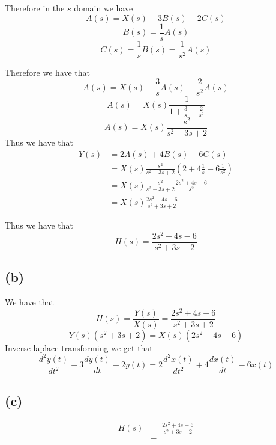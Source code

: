 \documentclass[12pt]{article}
\begin{document}
Therefore in the $s$ domain we have
$$A(s)=X(s)-3B(s)-2C(s)$$
$$B(s)=\frac{1}{s}A(s)$$
$$C(s)=\frac{1}{s}B(s)=\frac{1}{s^2}A(s)$$


Therefore we have that 
$$A(s)=X(s)-\frac{3}{s}A(s)-\frac{2}{s^2}A(s)$$
$$A(s)=X(s)\frac{1}{1+\frac{3}{s}+\frac{2}{s^2}}$$
$$A(s)=X(s)\frac{s^2}{s^2+3s+2}$$
Thus we have that 
\begin{align*}
Y(s)&=2A(s)+4B(s)-6C(s)\\
&=X(s)\frac{s^2}{s^2+3s+2}\left(2+4\frac{1}{s}-6\frac{1}{s^2}\right)\\
&=X(s)\frac{s^2}{s^2+3s+2}\frac{2s^2+4s-6}{s^2}\\
&=X(s)\frac{2s^2+4s-6}{s^2+3s+2}
\end{align*}

Thus we have that
$$H(s)=\boxed{\frac{2s^2+4s-6}{s^2+3s+2}}$$
\subsection*{(b)}
We have that
$$H(s)=\frac{Y(s)}{X(s)}=\frac{2s^2+4s-6}{s^2+3s+2}$$
$$Y(s)(s^2+3s+2)=X(s)(2s^2+4s-6)$$
Inverse laplace transforming we get that
$$\boxed{\frac{d^2y(t)}{dt^2}+3\frac{dy(t)}{dt}+2y(t)=2\frac{d^2x(t)}{dt^2}+4\frac{dx(t)}{dt}-6x(t)}$$
\subsection*{(c)}
\begin{align*}
H(s)&=\frac{2s^2+4s-6}{s^2+3s+2}\\
&=

\end{align*}
\end{document}
